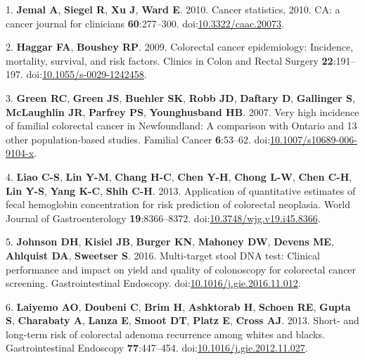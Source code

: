 \documentclass[12pt,]{article}
\begin{document}
\hypertarget{refs}{}
\hypertarget{ref-jemal_cancer_2010}{}
1. \textbf{Jemal A}, \textbf{Siegel R}, \textbf{Xu J}, \textbf{Ward E}.
2010. Cancer statistics, 2010. CA: a cancer journal for clinicians
\textbf{60}:277--300.
doi:\href{https://doi.org/10.3322/caac.20073}{10.3322/caac.20073}.

\hypertarget{ref-haggar_colorectal_2009}{}
2. \textbf{Haggar FA}, \textbf{Boushey RP}. 2009. Colorectal cancer
epidemiology: Incidence, mortality, survival, and risk factors. Clinics
in Colon and Rectal Surgery \textbf{22}:191--197.
doi:\href{https://doi.org/10.1055/s-0029-1242458}{10.1055/s-0029-1242458}.

\hypertarget{ref-green_very_2007}{}
3. \textbf{Green RC}, \textbf{Green JS}, \textbf{Buehler SK},
\textbf{Robb JD}, \textbf{Daftary D}, \textbf{Gallinger S},
\textbf{McLaughlin JR}, \textbf{Parfrey PS}, \textbf{Younghusband HB}.
2007. Very high incidence of familial colorectal cancer in Newfoundland:
A comparison with Ontario and 13 other population-based studies.
Familial Cancer \textbf{6}:53--62.
doi:\href{https://doi.org/10.1007/s10689-006-9104-x}{10.1007/s10689-006-9104-x}.

\hypertarget{ref-liao_application_2013}{}
4. \textbf{Liao C-S}, \textbf{Lin Y-M}, \textbf{Chang H-C}, \textbf{Chen
Y-H}, \textbf{Chong L-W}, \textbf{Chen C-H}, \textbf{Lin Y-S},
\textbf{Yang K-C}, \textbf{Shih C-H}. 2013. Application of quantitative
estimates of fecal hemoglobin concentration for risk prediction of
colorectal neoplasia. World Journal of Gastroenterology
\textbf{19}:8366--8372.
doi:\href{https://doi.org/10.3748/wjg.v19.i45.8366}{10.3748/wjg.v19.i45.8366}.

\hypertarget{ref-johnson_multi-target_2016}{}
5. \textbf{Johnson DH}, \textbf{Kisiel JB}, \textbf{Burger KN},
\textbf{Mahoney DW}, \textbf{Devens ME}, \textbf{Ahlquist DA},
\textbf{Sweetser S}. 2016. Multi-target stool DNA test: Clinical
performance and impact on yield and quality of colonoscopy for
colorectal cancer screening. Gastrointestinal Endoscopy.
doi:\href{https://doi.org/10.1016/j.gie.2016.11.012}{10.1016/j.gie.2016.11.012}.

\hypertarget{ref-laiyemo_short-_2013}{}
6. \textbf{Laiyemo AO}, \textbf{Doubeni C}, \textbf{Brim H},
\textbf{Ashktorab H}, \textbf{Schoen RE}, \textbf{Gupta S},
\textbf{Charabaty A}, \textbf{Lanza E}, \textbf{Smoot DT}, \textbf{Platz
E}, \textbf{Cross AJ}. 2013. Short- and long-term risk of colorectal
adenoma recurrence among whites and blacks. Gastrointestinal Endoscopy
\textbf{77}:447--454.
doi:\href{https://doi.org/10.1016/j.gie.2012.11.027}{10.1016/j.gie.2012.11.027}.
\end{document}
